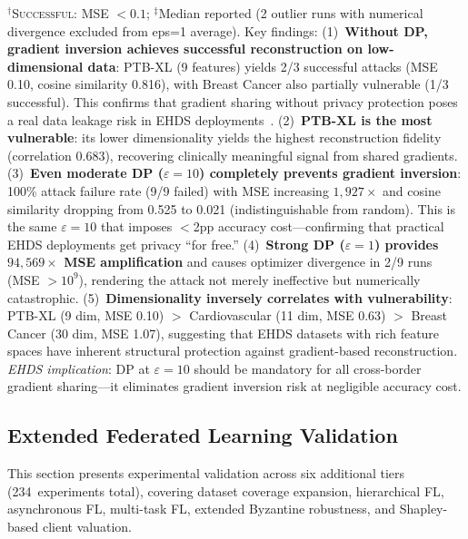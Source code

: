 \documentclass[conference]{IEEEtran}
\begin{document}
\begin{table}[htbp]
\vspace{1mm}
\footnotesize{$^\dagger$\textsc{Successful}: MSE $< 0.1$; $^\ddagger$Median reported (2 outlier runs with numerical divergence excluded from eps=1 average). Key findings: (1)~\textbf{Without DP, gradient inversion achieves successful reconstruction on low-dimensional data}: PTB-XL (9 features) yields 2/3 successful attacks (MSE 0.10, cosine similarity 0.816), with Breast Cancer also partially vulnerable (1/3 successful). This confirms that gradient sharing without privacy protection poses a real data leakage risk in EHDS deployments~\cite{geiping2020inverting}. (2)~\textbf{PTB-XL is the most vulnerable}: its lower dimensionality yields the highest reconstruction fidelity (correlation 0.683), recovering clinically meaningful signal from shared gradients. (3)~\textbf{Even moderate DP ($\varepsilon{=}10$) completely prevents gradient inversion}: 100\% attack failure rate (9/9 failed) with MSE increasing $1{,}927\times$ and cosine similarity dropping from 0.525 to 0.021 (indistinguishable from random). This is the same $\varepsilon{=}10$ that imposes $<$2pp accuracy cost---confirming that practical EHDS deployments get privacy ``for free.'' (4)~\textbf{Strong DP ($\varepsilon{=}1$) provides $94{,}569\times$ MSE amplification} and causes optimizer divergence in 2/9 runs (MSE $>10^{9}$), rendering the attack not merely ineffective but numerically catastrophic. (5)~\textbf{Dimensionality inversely correlates with vulnerability}: PTB-XL (9 dim, MSE 0.10) $>$ Cardiovascular (11 dim, MSE 0.63) $>$ Breast Cancer (30 dim, MSE 1.07), suggesting that EHDS datasets with rich feature spaces have inherent structural protection against gradient-based reconstruction. \textit{EHDS implication}: DP at $\varepsilon{=}10$ should be mandatory for all cross-border gradient sharing---it eliminates gradient inversion risk at negligible accuracy cost.}
\end{table}


\subsection{Extended Federated Learning Validation}
\label{sec:cascade6}

This section presents experimental validation across six additional tiers (234~experiments total), covering dataset coverage expansion, hierarchical FL, asynchronous FL, multi-task FL, extended Byzantine robustness, and Shapley-based client valuation.
\end{document}
